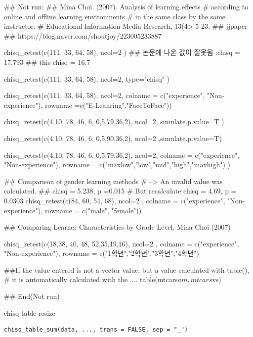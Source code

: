 \documentclass[a4paper]{book}
\begin{document}
\begin{Examples}
\begin{ExampleCode}

\#\# Not run: 
## Mina Choi. (2007). Analysis of learning effects
# according to online and offline learning environments
#  in the same class by the same instructor.
#  Educational Information Media Research, 13(4>  5-23.
## jjpaper
## https://blog.naver.com/shoutjoy/223005233887

chisq_retest(c(111, 33, 64, 58), ncol=2 )
## 논문에 나온 값이 잘못됨 :chisq = 17.793
## this chisq = 16.7

chisq_retest(c(111, 33, 64, 58), ncol=2, type="chisq" )

chisq_retest(c(111, 33, 64, 58), ncol=2,
  colname = c("experience", "Non-experience"),
  rowname =c("E-Leanring","FaceToFace"))

chisq_retest(c(4,10, 78, 46, 6, 0,5,79,36,2),
  ncol=2, simulate.p.value=T )

chisq_retest(c(4,10, 78, 46, 6, 0,5,90,36,2),
  ncol=2 ,simulate.p.value=T)

chisq_retest(c(4,10, 78, 46, 6, 0,5,79,36,2), ncol=2,
  colname = c("experience", "Non-experience"),
  rowname = c("maxlow","low","mid","high","maxhigh") )


##  Comparison of gender learning methods
# --> An invalid value was calculated.
## chisq = 5.238, p =0.015
# But recalculate chisq = 4.69, p = 0.0303
chisq_retest(c(84, 60, 54, 68), ncol=2 ,
             colname = c("experience", "Non-experience"),
                          rowname = c("male", "female"))

## Comparing Learner Characteristics by Grade Level, Mina Choi (2007)

chisq_retest(c(18,38, 40, 48, 52,35,19,16), ncol=2 ,
colname = c("experience", "Non-experience"),
rowname = c("1학년","2학년","3학년","4학년")


##If the value entered is not a vector value, but a value calculated with table(),
# it is automatically calculated with the ....
table(mtcars$am, mtcars$vs) %


## End(Not run)


\end{ExampleCode}
\end{Examples}
%
\begin{Description}
chisq table resize
\end{Description}
%
\begin{Usage}
\begin{verbatim}
chisq_table_sum(data, ..., trans = FALSE, sep = "_")
\end{verbatim}
\end{Usage}
\end{document}
